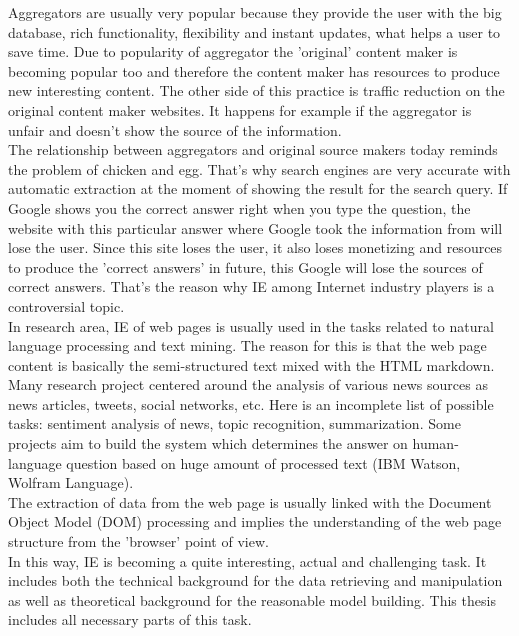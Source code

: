 Aggregators are usually very popular because they provide the user with the big database, rich functionality, flexibility and instant updates, what helps a user to save time. Due to popularity of aggregator the 'original' content maker is becoming popular too and therefore the content maker has resources to produce new interesting content. The other side of this practice is traffic reduction on the original content maker websites. It happens for example if the aggregator is unfair and doesn't show the source of the information. \\

The relationship between aggregators and original source makers today reminds the problem of chicken and egg. That's why search engines are very accurate with automatic extraction at the moment of showing the result for the search query. If Google shows you the correct answer right when you type the question, the website with this particular answer where Google took the information from will lose the user. Since this site loses the user, it also loses monetizing and resources to produce the 'correct answers' in future, this Google will lose the sources of correct answers. That's the reason why IE among Internet industry players is a controversial topic.\\

In research area, IE of web pages is usually used in the tasks related to natural language processing and text mining. The reason for this is that the web page content is basically the semi-structured text mixed with the HTML markdown. Many research project centered around the analysis of various news sources as news articles, tweets, social networks, etc. Here is an incomplete list of possible tasks: sentiment analysis of news, topic recognition, summarization. Some projects aim to build the system which determines the answer on human-language question based on huge amount of processed text (IBM Watson, Wolfram Language).\\      

The extraction of data from the web page is usually linked with the Document Object Model (DOM) processing and implies the understanding of the web page structure from the 'browser' point of view. \\

In this way, IE is becoming a quite interesting, actual and challenging task. It includes both the technical background for the data retrieving and manipulation as well as theoretical background for the reasonable model building. This thesis includes all necessary parts of this task.

